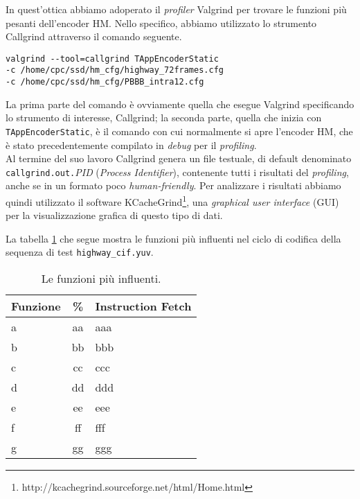 In quest'ottica abbiamo adoperato il \emph{profiler} Valgrind per trovare le 
funzioni più pesanti dell'encoder HM. Nello specifico, abbiamo utilizzato lo 
strumento Callgrind attraverso il comando seguente. \\

\begin{lstlisting}[breaklines]
valgrind --tool=callgrind TAppEncoderStatic 
-c /home/cpc/ssd/hm_cfg/highway_72frames.cfg 
-c /home/cpc/ssd/hm_cfg/PBBB_intra12.cfg
\end{lstlisting}

La prima parte del comando è ovviamente quella che esegue Valgrind specificando 
lo strumento di interesse, Callgrind; la seconda parte, quella che inizia con 
\verb|TAppEncoderStatic|, è il comando con cui normalmente si apre l'encoder 
HM, che è stato precedentemente compilato in \emph{debug} per il 
\emph{profiling}. \\
Al termine del suo lavoro Callgrind genera un file testuale, di default 
denominato \verb|callgrind.out.|\textit{PID} (\textit{Process Identifier}), 
contenente tutti i risultati del \emph{profiling}, anche se in un formato poco 
\emph{human-friendly}. 
Per analizzare i risultati abbiamo quindi utilizzato il software 
KCacheGrind\footnote{http://kcachegrind.sourceforge.net/html/Home.html}, una 
\textit{graphical user interface} (GUI) per la visualizzazione grafica di 
questo tipo di dati.

La tabella \ref{tabel-functions} che segue mostra le funzioni più influenti nel 
ciclo di codifica della sequenza di test \verb|highway_cif.yuv|. \\

\begin{table}[H]
  \centering
  \begin{tabular}{|l|c|l|}
    \hline
    Funzione & \% & Instruction Fetch \\ \hline \hline \hline
    a & aa & aaa \\ \hline
    b & bb & bbb \\ \hline
    c & cc & ccc \\ \hline
    d & dd & ddd \\ \hline
    e & ee & eee \\ \hline
    f & ff & fff \\ \hline
    g & gg & ggg \\ \hline
  \end{tabular}
  \caption{Le funzioni più influenti.}
  \label{tabel-functions}
\end{table}

